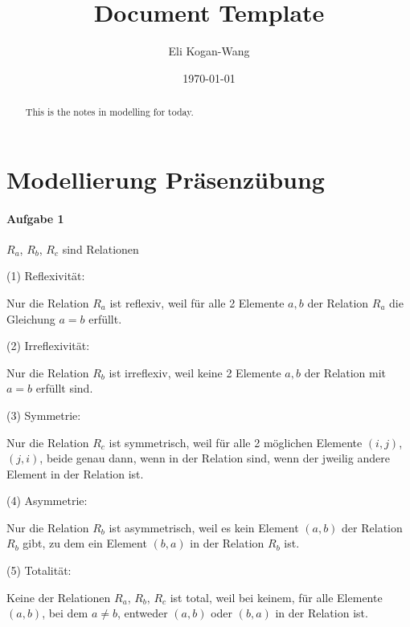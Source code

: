 \documentclass[a4paper,12pt]{article}
\title{Document Template}
\author{Eli Kogan-Wang}
\date{\today}
\begin{document}
\renewcommand{\abstractname}{Abstract}
\begin{abstract}
    This is the notes in modelling for today.
\end{abstract}

\section{Modellierung Präsenzübung}

\paragraph{Aufgabe 1}

$R_a$, $R_b$, $R_c$ sind Relationen

(1) Reflexivität:

Nur die Relation $R_a$ ist reflexiv, weil für alle 2 Elemente $a,b$ der Relation
$R_a$ die Gleichung $a=b$ erfüllt.

(2) Irreflexivität:

Nur die Relation $R_b$ ist irreflexiv, weil keine 2 Elemente $a,b$ der Relation mit $a=b$ erfüllt sind.

(3) Symmetrie:

Nur die Relation $R_c$ ist symmetrisch, weil für alle 2 möglichen Elemente $(i,j)$, $(j,i)$,
beide genau dann, wenn in der Relation sind, wenn der jweilig
andere Element in der Relation ist.

(4) Asymmetrie:

Nur die Relation $R_b$ ist asymmetrisch, weil es kein Element $(a,b)$ der Relation $R_b$ gibt, zu dem ein Element $(b,a)$ in der Relation $R_b$ ist.

(5) Totalität:

Keine der Relationen $R_a$, $R_b$, $R_c$ ist total, weil bei keinem, für alle Elemente $(a,b)$, bei dem $a\neq b$, entweder $(a,b)$ oder $(b,a)$ in der Relation ist.
\end{document}

